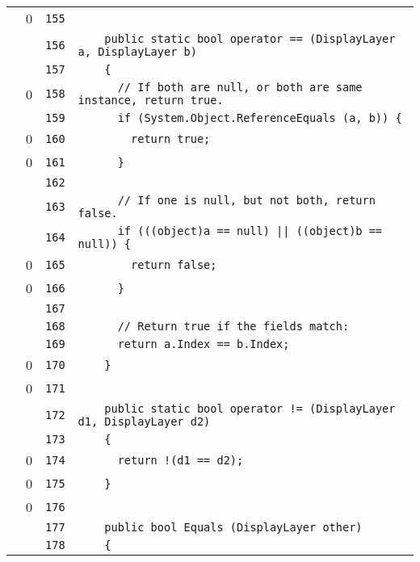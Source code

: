 \documentclass[a4paper,10pt]{article}
\begin{document}
\begin{longtable}[l]{lrrl}
\cellcolor{red} & 0 & \verb~155~ & \verb~~\\
\cellcolor{gray} &  & \verb~156~ & \verb~    public static bool operator == (DisplayLayer a, DisplayLayer b)~\\
\cellcolor{gray} &  & \verb~157~ & \verb~    {~\\
\cellcolor{red} & 0 & \verb~158~ & \verb~      // If both are null, or both are same instance, return true.~\\
\cellcolor{gray} &  & \verb~159~ & \verb~      if (System.Object.ReferenceEquals (a, b)) {~\\
\cellcolor{red} & 0 & \verb~160~ & \verb~        return true;~\\
\cellcolor{red} & 0 & \verb~161~ & \verb~      }~\\
\cellcolor{gray} &  & \verb~162~ & \verb~~\\
\cellcolor{gray} &  & \verb~163~ & \verb~      // If one is null, but not both, return false.~\\
\cellcolor{gray} &  & \verb~164~ & \verb~      if (((object)a == null) || ((object)b == null)) {~\\
\cellcolor{red} & 0 & \verb~165~ & \verb~        return false;~\\
\cellcolor{red} & 0 & \verb~166~ & \verb~      }~\\
\cellcolor{gray} &  & \verb~167~ & \verb~~\\
\cellcolor{gray} &  & \verb~168~ & \verb~      // Return true if the fields match:~\\
\cellcolor{gray} &  & \verb~169~ & \verb~      return a.Index == b.Index;~\\
\cellcolor{red} & 0 & \verb~170~ & \verb~    }~\\
\cellcolor{red} & 0 & \verb~171~ & \verb~~\\
\cellcolor{gray} &  & \verb~172~ & \verb~    public static bool operator != (DisplayLayer d1, DisplayLayer d2)~\\
\cellcolor{gray} &  & \verb~173~ & \verb~    {~\\
\cellcolor{red} & 0 & \verb~174~ & \verb~      return !(d1 == d2);~\\
\cellcolor{red} & 0 & \verb~175~ & \verb~    }~\\
\cellcolor{red} & 0 & \verb~176~ & \verb~~\\
\cellcolor{gray} &  & \verb~177~ & \verb~    public bool Equals (DisplayLayer other)~\\
\cellcolor{gray} &  & \verb~178~ & \verb~    {~\\

\end{longtable}
\end{document}
